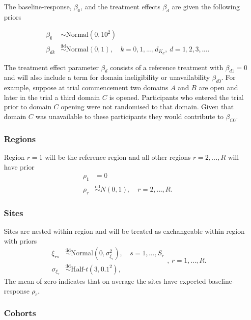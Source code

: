 \documentclass[
  11pt,
]{article}
\begin{document}
The baseline-response, \(\beta_0\), and the treatment effects \(\beta_d\) are given the following priors

\[
\begin{aligned}
\beta_0 &\sim \text{Normal}(0, 10^2) \\
\beta_{dk} &\overset{\text{iid}}{\sim} \text{Normal}(0, 1),\quad k=0,1,...,d_{K_d},\ d=1,2,3,....
\end{aligned}
\]

The treatment effect parameter \(\beta_d\) consists of a reference treatment with \(\beta_{d1}=0\) and will also include a term for domain ineligibility or unavailability \(\beta_{d0}\).
For example, suppose at trial commencement two domains \(A\) and \(B\) are open and later in the trial a third domain \(C\) is opened.
Participants who entered the trial prior to domain \(C\) opening were not randomised to that domain.
Given that domain \(C\) was unavailable to these participants they would contribute to \(\beta_{C0}\).

\hypertarget{regions}{%
\subsubsection{Regions}\label{regions}}

Region \(r=1\) will be the reference region and all other regions \(r=2,...,R\) will have prior
\[
\begin{aligned}
\rho_1 &= 0 \\
\rho_r &\overset{\text{iid}}{\sim} N(0, 1),\quad r=2,...,R.
\end{aligned}
\]

\hypertarget{sites}{%
\subsubsection{Sites}\label{sites}}

Sites are nested within region and will be treated as exchangeable within region with priors
\[
\begin{aligned}
\xi_{rs} &\overset{\text{iid}}{\sim} \text{Normal}\left(0, \sigma_{\xi_r}^2\right),\quad s=1,...,S_r\\
\sigma_{\xi_r} &\overset{\text{iid}}{\sim} \text{Half-}t(3,0.1^2), 
\end{aligned},\ r=1,...,R.
\]
The mean of zero indicates that on average the sites have expected baseline-response \(\rho_r\).

\hypertarget{cohorts}{%
\subsubsection{Cohorts}\label{cohorts}}
\end{document}
